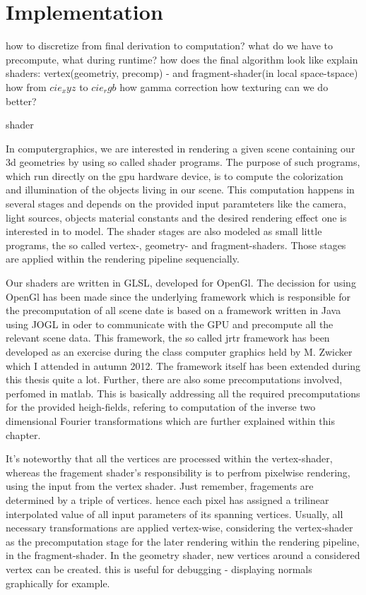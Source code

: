 \section{Implementation}

how to discretize from final derivation to computation?
what do we have to precompute, what during runtime?
how does the final algorithm look like
explain shaders: vertex(geometriy, precomp) - and fragment-shader(in local space-tspace)
how from $cie_xyz$ to $cie_rgb$
how gamma correction
how texturing 
can we do better?


shader

In computergraphics, we are interested in rendering a given scene containing our 3d geometries by using so called shader programs. 
The purpose of such programs, which run directly on the gpu hardware device, is to compute the colorization and illumination of the objects living in our scene. This computation happens in several stages and depends on the provided input paramteters like the camera, light sources, objects material constants and the desired rendering effect one is interested in to model. The shader stages are also modeled as small little programs, the so called vertex-, geometry- and fragment-shaders. Those stages are applied within the rendering pipeline sequencially. 

Our shaders are written in GLSL, developed for OpenGl. The decission for using OpenGl has been made since the underlying framework which is responsible for the precomputation of all scene date is based on a framework written in Java using JOGL in oder to communicate with the GPU and precompute all the relevant scene data. This framework, the so called jrtr framework has been developed as an exercise during the class computer graphics held by M. Zwicker which I attended in autumn 2012. The framework itself has been extended during this thesis quite a lot. Further, there are also some precomputations involved, perfomed in matlab. This is basically addressing all the required precomputations for the provided heigh-fields, refering to computation of the inverse two dimensional Fourier transformations which are further explained within this chapter.  

It's noteworthy that all the vertices are processed within the vertex-shader, whereas the fragement shader's responsibility is to perfrom pixelwise rendering, using the input from the vertex shader. Just remember, fragements are determined by a triple of vertices. hence each pixel has assigned a trilinear interpolated value of all input parameters of its spanning vertices.
Usually, all necessary transformations are applied vertex-wise, considering the vertex-shader as the precomputation stage for the later rendering within the rendering pipeline, in the fragment-shader. In the geometry shader, new vertices around a considered vertex can be created. this is useful for debugging - displaying normals graphically for example.

